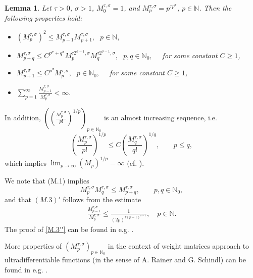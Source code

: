 \documentclass{article}
\theoremstyle{thmstyleone}
\newtheorem{Lemma}[Theorem]{Lemma}%
\theoremstyle{thmstyletwo}%
\theoremstyle{thmstylethree}%
\begin{document}
\begin{Lemma} \label{osobineM_p_s}
Let $\tau>0$, $\sigma>1$, $M_0 ^{\tau,\sigma}=1$,
and $M_p ^{\tau,\sigma}=p^{\tau p^{\sigma}}$, $p\in \mathbb N$.
Then the following properties hold:
\begin{itemize}
\item[$(M.1)$] \hspace{1em} 
$ (M_p^{\tau,\sigma})^2\leq M_{p-1}^{\tau,\sigma}M_{p+1}^{\tau,\sigma}, \;$ $p\in \mathbb N, $ \medskip
\item[$\widetilde{(M.2)}$]  \hspace{1em}   
$ M_{p+q}^{\tau,\sigma}\leq C^{p^{\sigma} + q^{\sigma}}
M_p^{\tau 2^{\sigma-1},\sigma}M_q^{\tau 2^{\sigma-1},\sigma},\;$
$ p,q\in \mathbb N_0,\quad$
for some constant $ C\geq 1$,\medskip
\item[$\widetilde{(M.2)'}$] \hspace{1em}
$ M_{p+1}^{\tau,\sigma}\leq C ^{p^{\sigma}} M_p^{\tau,\sigma}, \;$ 
$ p\in \mathbb N_0, \quad$
for some constant $C\geq 1$, \medskip
\item[$(M.3)'$] \hspace{1em}
$ \displaystyle   \sum\limits_{p=1}^{\infty}\frac{M_{p-1}^{\tau,\sigma}}{M_p^{\tau,\sigma}} <\infty.
$
\end{itemize} 
\end{Lemma}

In addition,  $%
\left ( \left (\frac{M_{p}^{\tau,\sigma}}{p!} \right )^{1/p} \right )_{p\in\mathbb N_0}$
is an almost increasing sequence, i.e.
$$
\left(\frac{M_{p}^{\tau,\sigma}}{p!} \right)^{1/p} 
\leq 
C \left(\frac{M_{q}^{\tau,\sigma}}{q!} \right)^{1/q}, \qquad
p\leq q,
$$
which implies 
$ \lim_{p \rightarrow \infty} (M_{p})^{1/ p} = \infty$
(cf. \cite{TTZ2024}).


We note that (M.1) implies 
\begin{equation} \label{M.1'}
M_p^{\tau,\sigma}M_q^{\tau,\sigma}\leq M_{p+q}^{\tau,\sigma},\qquad p,q\in\mathbb N_0,
\end{equation}
and that $(M.3)'$ follows from the estimate
\begin{align}\label{M.3''}
        \frac{M_{p-1}^{\tau,\sigma}}{M_p^{\tau,\sigma}}\leq\frac{1}{(2p)^{\tau(p-1)^{\sigma-1}}},\quad p\in\mathbb N.
\end{align}
The proof of \eqref{M.3''} can be found in e.g. \cite[Appendix A]{TTZ2024}.


More properties of  $(M_{p}^{\tau,\sigma})_{p\in\mathbb N_0}$ in the context of weight matrices approach to ultradifferentiable functions (in the sense of A. Rainer and G. Schindl)
can be found in e.g. \cite{Garrido-2}.  
\end{document}
